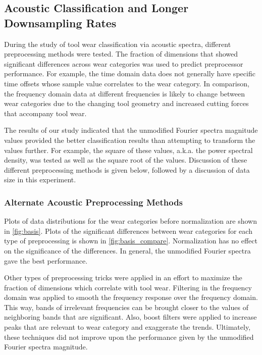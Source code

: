 \subsection{Acoustic Classification and Longer Downsampling Rates
\label{chap:9}}

During the study of tool wear classification via acoustic spectra, 
different preprocessing methods were tested. 
The fraction of dimensions that showed significant differences 
across wear categories was used to predict preprocessor performance.
For example, the time domain data does not generally have specific 
time offsets whose sample value correlates to the wear category.
In comparison, the frequency domain data at different frequencies
is likely to change between wear categories due to the changing tool geometry
and increased cutting forces that accompany tool wear.

The results of our study indicated that the unmodified Fourier spectra magnitude values
provided the better classification results than attempting to transform the values further.
For example, the square of these values, a.k.a. the power spectral density, 
was tested as well as the square root of the values. Discussion of these different preprocessing
methods is given below, followed by a discussion of data size in this experiment.


\subsubsection{Alternate Acoustic Preprocessing Methods}


Plots of data distributions for the wear categories before normalization are shown in \ref{fig:basis}.
Plots of the significant differences between wear categories for each type of preprocessing 
is shown in \ref{fig:basis_compare}. Normalization has no effect on the significance of the differences.
In general, the unmodified Fourier spectra gave the best performance.

Other types of preprocessing tricks were applied in an effort 
to maximize the fraction of dimensions which correlate with tool wear.
Filtering in the frequency domain was applied to smooth 
the frequency response over the frequency domain.
This way, bands of irrelevant frequencies can be brought closer to the
values of neighboring bands that are significant. 
Also, boost filters were applied to increase peaks that are
relevant to wear category and exaggerate the trends.
Ultimately, these techniques did not improve upon the performance
given by the unmodified Fourier spectra magnitude.

